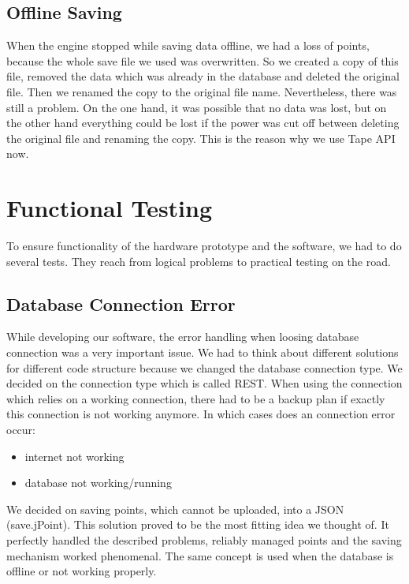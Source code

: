 \subsection{Offline Saving}
When the engine stopped while saving data offline, we had a loss of points, because the whole save file we used was overwritten. So we created a copy of this file, removed the data which was already in the database and deleted the original file. Then we renamed the copy to the original file name. Nevertheless, there was still a problem. On the one hand, it was possible that no data was lost, but on the other hand everything could be lost if the power was cut off between deleting the original file and renaming the copy. This is the reason why we use Tape API now. 
\section{Functional Testing}
To ensure functionality of the hardware prototype and the software, we had to do several tests. They reach from logical problems to practical testing on the road.
\subsection{Database Connection Error}
While developing our software, the error handling when loosing database connection was a very important issue. We had to think about different solutions for different code structure because we changed the database connection type. 
\newline \newline
We decided on the connection type which is called REST. When using the connection which relies on a working connection, there had to be a backup plan if exactly this connection is not working anymore.
\newline \newline
In which cases does an connection error occur:
\begin{itemize}
\item internet not working
\item database not working/running
\end{itemize}

We decided on saving points, which cannot be uploaded, into a JSON (save.jPoint). This solution proved to be the most fitting idea we thought of. It perfectly handled the described problems, reliably managed points and the saving mechanism worked phenomenal.
\newline \newline
The same concept is used when the database is offline or not working properly. 

